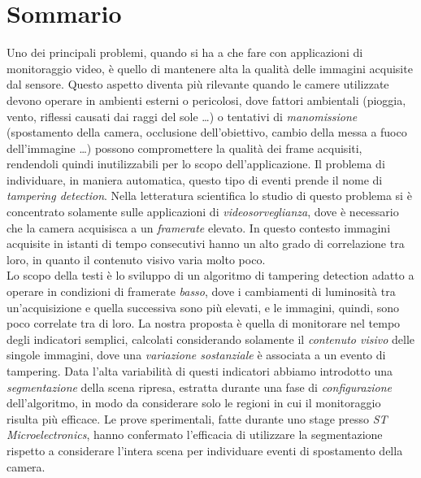 \newpage
\chapter*{Sommario}


Uno dei principali problemi, quando si ha a che fare con applicazioni di monitoraggio video, \`e quello di mantenere alta la qualit\`a delle immagini acquisite dal sensore.
Questo aspetto diventa pi\`u rilevante quando le camere utilizzate devono operare in ambienti esterni o pericolosi, dove fattori ambientali (pioggia, vento, riflessi causati dai raggi del sole \dots) o tentativi di \textit{manomissione} (spostamento della camera, occlusione dell'obiettivo, cambio della messa a fuoco dell'immagine \dots) possono compromettere la qualit\`a dei frame acquisiti, rendendoli quindi inutilizzabili per lo scopo dell'applicazione.
Il problema di individuare, in maniera automatica, questo tipo di eventi prende il nome di \textit{tampering detection}. 
Nella letteratura scientifica lo studio di questo problema si \`e concentrato solamente sulle applicazioni di \textit{videosorveglianza}, dove \`e necessario che la camera acquisisca a un \textit{framerate} elevato.
In questo contesto immagini acquisite in istanti di tempo consecutivi hanno un alto grado di correlazione tra loro, in quanto il contenuto visivo varia molto poco.\\
Lo scopo della testi \`e lo sviluppo di un algoritmo di tampering detection adatto a operare in condizioni di framerate \textit{basso}, dove i cambiamenti di luminosit\`a tra un'acquisizione e quella successiva sono pi\`u elevati, e le immagini, quindi, sono poco correlate tra di loro. 
La nostra proposta \`e quella di monitorare nel tempo degli indicatori semplici, calcolati considerando solamente il \textit{contenuto visivo} delle singole immagini, dove una \textit{variazione sostanziale} \`e associata a un evento di tampering. 
Data l'alta variabilit\`a di questi indicatori abbiamo introdotto una \textit{segmentazione} della scena ripresa, estratta durante una fase di \textit{configurazione} dell'algoritmo, in modo da considerare solo le regioni in cui il monitoraggio risulta pi\`u efficace. 
Le prove sperimentali, fatte durante uno stage presso \textit{ST Microelectronics}, hanno confermato l'efficacia di utilizzare la segmentazione rispetto a considerare l'intera scena per individuare eventi di spostamento della camera. 